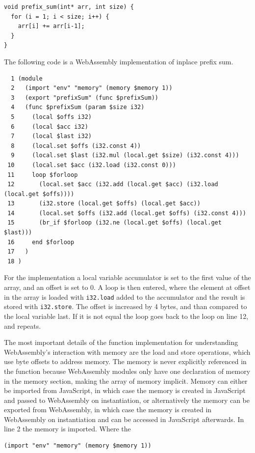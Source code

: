 \documentclass[11pt]{book}
\begin{document}
\begin{verbatim}
void prefix_sum(int* arr, int size) {
  for (i = 1; i < size; i++) {
    arr[i] += arr[i-1];
  }
}
\end{verbatim}
The following code is a WebAssembly implementation of inplace prefix sum.
\begin{verbatim}
  1 (module
  2   (import "env" "memory" (memory $memory 1))
  3   (export "prefixSum" (func $prefixSum))
  4   (func $prefixSum (param $size i32)
  5     (local $offs i32)
  6     (local $acc i32)
  7     (local $last i32)
  8     (local.set $offs (i32.const 4))
  9     (local.set $last (i32.mul (local.get $size) (i32.const 4)))
 10     (local.set $acc (i32.load (i32.const 0)))
 11     loop $forloop
 12       (local.set $acc (i32.add (local.get $acc) (i32.load (local.get $offs))))
 13       (i32.store (local.get $offs) (local.get $acc))
 14       (local.set $offs (i32.add (local.get $offs) (i32.const 4)))
 15       (br_if $forloop (i32.ne (local.get $offs) (local.get $last)))
 16     end $forloop
 17   )
 18 )
\end{verbatim}

For the implementation a local variable accumulator is set to the first value of the array, and an offset is set to 0. A loop is then entered, where the element at offset in the array is loaded with \texttt{i32.load} added to the accumulator and the result is stored with \texttt{i32.store}. The offset is increased by 4 bytes, and than compared to the local variable last. If it is not equal the loop goes back to the loop on line 12, and repeats.

The most important details of the function implementation for understanding WebAssembly's interaction with memory are the load and store operations, which use byte offsets to address memory. The memory is never explicitly referenced in the function because WebAssembly modules only have one declaration of memory in the memory section, making the array of memory implicit. Memory can either be imported from JavaScript, in which case the memory is created in JavaScript and passed to WebAssembly on instantiation, or alternatively the memory can be exported from WebAssembly, in which case the memory is created in WebAssembly on instantiation and can be accessed in JavaScript afterwards. In line 2 the memory is imported. Where the 
\begin{verbatim}
(import "env" "memory" (memory $memory 1))
\end{verbatim}
\end{document}
